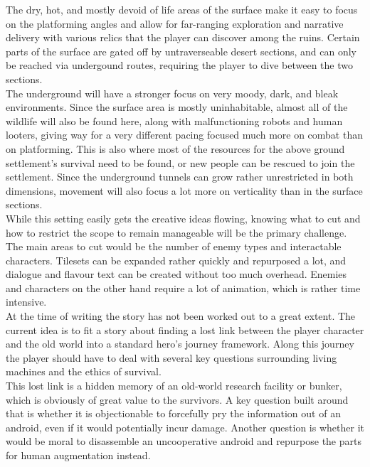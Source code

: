 The dry, hot, and mostly devoid of life areas of the surface make it easy to focus on the platforming angles and allow for far-ranging exploration and narrative delivery with various relics that the player can discover among the ruins. Certain parts of the surface are gated off by untraverseable desert sections, and can only be reached via undergound routes, requiring the player to dive between the two sections. \\

The underground will have a stronger focus on very moody, dark, and bleak environments. Since the surface area is mostly uninhabitable, almost all of the wildlife will also be found here, along with malfunctioning robots and human looters, giving way for a very different pacing focused much more on combat than on platforming. This is also where most of the resources for the above ground settlement's survival need to be found, or new people can be rescued to join the settlement. Since the underground tunnels can grow rather unrestricted in both dimensions, movement will also focus a lot more on verticality than in the surface sections. \\

While this setting easily gets the creative ideas flowing, knowing what to cut and how to restrict the scope to remain manageable will be the primary challenge. The main areas to cut would be the number of enemy types and interactable characters. Tilesets can be expanded rather quickly and repurposed a lot, and dialogue and flavour text can be created without too much overhead. Enemies and characters on the other hand require a lot of animation, which is rather time intensive. \\

At the time of writing the story has not been worked out to a great extent. The current idea is to fit a story about finding a lost link between the player character and the old world into a standard hero's journey framework. Along this journey the player should have to deal with several key questions surrounding living machines and the ethics of survival. \\

This lost link is a hidden memory of an old-world research facility or bunker, which is obviously of great value to the survivors. A key question built around that is whether it is objectionable to forcefully pry the information out of an android, even if it would potentially incur damage. Another question is whether it would be moral to disassemble an uncooperative android and repurpose the parts for human augmentation instead.


